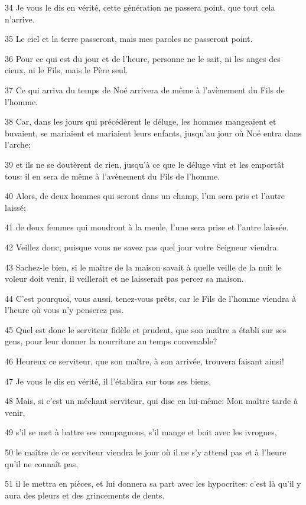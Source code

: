 \par 34 Je vous le dis en vérité, cette génération ne passera point, que tout cela n'arrive.
\par 35 Le ciel et la terre passeront, mais mes paroles ne passeront point.
\par 36 Pour ce qui est du jour et de l'heure, personne ne le sait, ni les anges des cieux, ni le Fils, mais le Père seul.
\par 37 Ce qui arriva du temps de Noé arrivera de même à l'avènement du Fils de l'homme.
\par 38 Car, dans les jours qui précédèrent le déluge, les hommes mangeaient et buvaient, se mariaient et mariaient leurs enfants, jusqu'au jour où Noé entra dans l'arche;
\par 39 et ils ne se doutèrent de rien, jusqu'à ce que le déluge vînt et les emportât tous: il en sera de même à l'avènement du Fils de l'homme.
\par 40 Alors, de deux hommes qui seront dans un champ, l'un sera pris et l'autre laissé;
\par 41 de deux femmes qui moudront à la meule, l'une sera prise et l'autre laissée.
\par 42 Veillez donc, puisque vous ne savez pas quel jour votre Seigneur viendra.
\par 43 Sachez-le bien, si le maître de la maison savait à quelle veille de la nuit le voleur doit venir, il veillerait et ne laisserait pas percer sa maison.
\par 44 C'est pourquoi, vous aussi, tenez-vous prêts, car le Fils de l'homme viendra à l'heure où vous n'y penserez pas.
\par 45 Quel est donc le serviteur fidèle et prudent, que son maître a établi sur ses gens, pour leur donner la nourriture au temps convenable?
\par 46 Heureux ce serviteur, que son maître, à son arrivée, trouvera faisant ainsi!
\par 47 Je vous le dis en vérité, il l'établira sur tous ses biens.
\par 48 Mais, si c'est un méchant serviteur, qui dise en lui-même: Mon maître tarde à venir,
\par 49 s'il se met à battre ses compagnons, s'il mange et boit avec les ivrognes,
\par 50 le maître de ce serviteur viendra le jour où il ne s'y attend pas et à l'heure qu'il ne connaît pas,
\par 51 il le mettra en pièces, et lui donnera sa part avec les hypocrites: c'est là qu'il y aura des pleurs et des grincements de dents.

